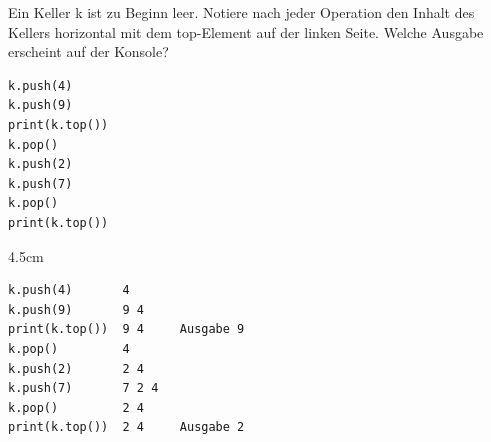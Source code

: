 \question[3]
Ein Keller k ist zu Beginn leer. Notiere nach jeder Operation den Inhalt des Kellers horizontal mit dem top-Element
auf der linken Seite. Welche Ausgabe erscheint auf der Konsole?
\begin{lstlisting}
k.push(4)
k.push(9)
print(k.top())
k.pop()
k.push(2)
k.push(7)
k.pop()
print(k.top())
\end{lstlisting}
\begin{solutionbox}{4.5cm}
\begin{lstlisting}[language={}]
k.push(4)       4
k.push(9)       9 4
print(k.top())  9 4     Ausgabe 9
k.pop()         4
k.push(2)       2 4
k.push(7)       7 2 4
k.pop()         2 4
print(k.top())  2 4     Ausgabe 2
\end{lstlisting}
\end{solutionbox}
